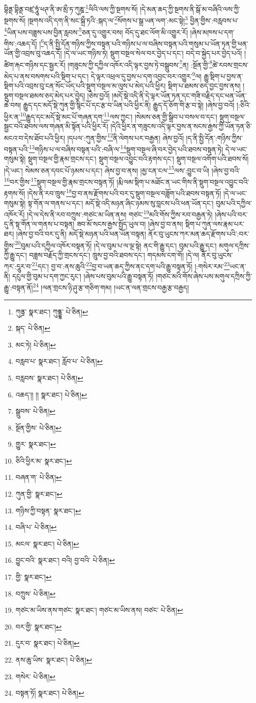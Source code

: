 བྷིནྡ་བྷིནྡ་བཛྲ་ཧཱུཾ་ཕཊ་ནི་ཨ་མྲྀ་ཏ་ཀུཎྜ་\footnote{ཀུནྜ་  སྣར་ཐང་། ཀུནྡྷ་  པེ་ཅིན། }ལིའི་ལས་ཀྱི་སྔགས་སོ། །དེ་མན་ཆད་ཀྱི་སྔགས་ནི་སྒོ་མ་བཞིའི་ལས་ཀྱི་སྔགས་སོ། །སྔགས་འདི་དག་ནི་སང་སྐྲྀ་ཏའི་:སྐད་ལ་\footnote{སྐད་  པེ་ཅིན། }སོགས་པ་སྒྲ་ཡན་ལག་:མང་སྟེ།\footnote{མང་ཏེ།  པེ་ཅིན། } བྱིན་གྱིས་:བརླབས་པ་\footnote{བརླབ་པ་  སྣར་ཐང་། རློབ་པ་  པེ་ཅིན། }ཡིན་པས་བཟླས་པས་བྱིན་རླབས་\footnote{བརླབས་  སྣར་ཐང་།  པེ་ཅིན། }ཅན་དུ་འགྱུར་བས། བོད་དུ་ཐང་ལོག་མི་འགྱུར་རོ། །ཞེས་མཁས་པ་དག་གིས་:འཆད་དོ། །\footnote{འཆད་།། །།  སྣར་ཐང་།  པེ་ཅིན། }ད་ནི་སྤྱི་དོན་གཉིས་ཀྱིས་བསྟན་པའི་གཉིས་པ་ལ་བཞིས་བསྟན་པའི་གསུམ་པ་ཡོན་ཏན་གྱི་ཕན་ཡོན་གྱི་འབྲས་བུ་འཆད་དོ། །དེ་ལ་ཡང་གཉིས་ཏེ། སྡུག་བསྔལ་སེལ་བར་བྱེད་པ་དང་། བདེ་བ་སྐྱེད་པར་བྱེད་པའོ། །ཚིག་རྐང་གཉིས་དང་སྦྱར་རོ། །གཟུངས་ཀྱི་དཀྱིལ་འཁོར་འདི་ལྟར་བྱས་ཏེ་བསྒྲུབས་\footnote{སྒྲུབས་  པེ་ཅིན། }ན། :སྔོན་གྱི་\footnote{སྔོན་གྱིས་  པེ་ཅིན། }ཚེ་རབས་གྲངས་མེད་པ་ནས་བསགས་པའི་སྡིག་པ་དང་། དེ་ལྟར་འཕྲལ་དུ་བྱས་པ་དག་འབྱང་བར་འགྱུར་\footnote{གྱུར་  སྣར་ཐང་། }ལ། རྒྱུ་སྡིག་པ་བྱས་ན་སྡིག་པའི་འབྲས་བུ་ངན་སོང་ཡོད་པའི་སྡུག་བསྔལ་མ་ལུས་པ་མེད་པའི་ཕྱིར། སྡིག་པ་ཐམས་ཅད་བྱང་བྱས་ནས། །སྡུག་བསྔལ་ཐམས་ཅད་མེད་པར་བྱེད། །ཅེས་བྱའོ། །མདོ་སྡེ་འདི་ནི་དེ་ལྟར་ཡོན་ཏན་དང་གཟི་བརྗིད་དང་ཕན་ཡོན་ཆེ་བས། རྒྱུད་དང་མདོ་སྡེ་ཀུན་གྱི་སྙིང་པོ་དང་རྩ་བ་ཡིན་པའི་ཕྱིར་ནི། རྒྱུད་དོ་ཅོག་གི་རྩ་བ་སྟེ། །ཞེས་བྱ་བའོ། །:ཅིའི་ཕྱིར་ན་\footnote{ཅིའི་ཕྱིར་མ་  སྣར་ཐང་། }རྒྱུད་དང་མདོ་སྡེ་མང་པོ་གཞན་དག་\footnote{བཞན་ག་  པེ་ཅིན། }ལས་ཀྱང་། །སེམས་ཅན་གྱི་སྒྲིབ་པ་བསལ་བ་དང་། སྡུག་བསྔལ་སྦྱང་བའི་ཐབས་ལས་གཞན་མི་སྟོན་པའི་ཕྱིར་རོ། །དེའི་ཕྱིར་ན་གཟུངས་འདི་ལྟར་བྱས་ན་སངས་རྒྱས་ཀྱི་ཡོན་ཏན་ཅི་མངའ་བ་དེས་ཐོབ་པའི་ཕྱིར། །དཔལ་:ཀུན་གྱིས་\footnote{ཀུན་གྱི་  སྣར་ཐང་། }ནི་ལེགས་པར་བརྒྱན། ཞེས་བྱའོ། །ད་ནི་སྤྱི་དོན་:གཉིས་ཀྱིས་བསྟན་པའི་\footnote{གཉིས་ཀྱི་བསྟན་  སྣར་ཐང་། }གཉིས་པ་ལ་བཞིས་བསྟན་པའི་:བཞི་ལ་\footnote{བཞི་པ་  པེ་ཅིན། }སྡུག་བསྔལ་ཞི་བར་བྱེད་པའི་ཐབས་བསྟན་ཏེ། དེ་ལ་ཡང་གསུམ་སྟེ། སྡུག་བསྔལ་གྱི་རྣམ་གྲངས་དང་། སྡུག་བསྔལ་འབྱུང་བའི་རྟགས་དང་། སྡུག་བསྔལ་འགོག་པའི་ཐབས་སོ། །དེ་ཡང་། སེམས་ཅན་དབང་པོ་ཉམས་པ་དང་། ཞེས་བྱ་བ་ནས། །མྱ་ངན་ངལ་\footnote{མངལ་  སྣར་ཐང་།  པེ་ཅིན། }ལས་:བྱུང་བ་ཡི། །ཞེས་བྱ་བའི་\footnote{བྱུང་བའི་  སྣར་ཐང་། བའི། བྱ་བའི་  པེ་ཅིན། }བར་གྱིས་\footnote{གྱི་  སྣར་ཐང་། }སྡུག་བསྔལ་གྱི་རྣམ་གྲངས་བསྟན་ཏོ། །རྨི་ལམ་སྡིག་པ་མཐོང་ན་ཡང་གིས་ནི་སྡུག་བསྔལ་འབྱུང་བའི་རྟགས་སོ། །དེས་ནི་རབ་ཁྲུས་\footnote{བཀྲུས་  པེ་ཅིན། }བྱ་བ་ནས་རྫོགས་པའི་བར་དུ་སྡུག་བསྔལ་བཟློག་པའི་ཐབས་བསྟན་ཏོ། །དེ་ལ་ཡང་གསུམ་སྟེ། སྟ་གོན་ལ་གནས་པ་དང་། མདོ་སྡེ་འདི་མཉན་ཞིང་ཉམས་སུ་བླངས་པའི་ཕན་ཡོན་དང་། བུམ་པའི་དཀྱིལ་འཁོར་རོ། །དེ་ལ་དེས་ནི་རབ་བཀྲུས་:གཙང་མ་ཡིན་ནས། གཙང་\footnote{གཙང་མ་ཡིས་ནས་གཙང་  སྣར་ཐང་། གཙང་མ་ཡིས་ནས། བཙང་  པེ་ཅིན། }མའི་གོས་ཀྱིས་རབ་བརྒྱན་ཏེ། །ཞེས་པའི་བར་དུ་ནི་སྟ་གོན་ལ་གནས་པ་བསྟན། ཟབ་མོ་སངས་རྒྱས་སྤྱོད་ཡུལ་བ། །ཞེས་བྱ་བ་ནས། སྡིག་པ་ཀུན་ལས་རྣམ་པར་ཐར། །ཞེས་བྱ་བའི་བར་དུ་ནི། མདོ་སྡེ་མཉན་པའི་ཕན་ཡོན་བསྟན། ནོར་བུ་ཡུངས་ཀར་མན་ཆད་རྫོགས་པའི་:བར་གྱིས་\footnote{བར་གྱི་  སྣར་ཐང་། }བུམ་པའི་དཀྱིལ་འཁོར་བསྟན་ཏོ། །དེ་ལ་བུམ་པ་ལ་ལྔ་སྟེ། ནང་གི་རྒྱུ་དང་། བུམ་པའི་རྒྱུ་དང་། མགུལ་དཀྲིས་ཀྱི་རྒྱུ་དང་། བཟླས་བརྗོད་ཀྱི་གྲངས་དང་། ཁྲུས་བྱ་བའི་ཐབས་དང་། གདམས་ངག་གོ། །དེ་ལ། ནོར་བུ་ཡུངས་ཀར་:དཱུར་བ་\footnote{དུར་བ་  སྣར་ཐང་།  པེ་ཅིན། }དང་། བྱ་བ་:ནས་ཆུའི་\footnote{ནས་ཆུ་ཡིས་  སྣར་ཐང་།  པེ་ཅིན། }བྱ་བ་ཡན་ཆད་ཀྱིས་ནང་དག་པའི་རྒྱུ་བསྟན་ཏོ། །:གསེར་རམ་\footnote{གསེར་  པེ་ཅིན། }ཡང་ན་ནི། དངུལ་གྱི་བུམ་པ་དག་ཀྱང་རུང་། །ཞེས་པས་བུམ་པའི་རྒྱུ་བསྟན་ཏོ། །གཙང་མའི་གོས་ཞེས་པས་མགུལ་དཀྲིས་ཀྱི་རྒྱུ་:བསྟན་ནོ།\footnote{བསྟན་ཏོ།  སྣར་ཐང་།  པེ་ཅིན། } །ལན་གྲངས་ཉི་ཤུ་རྩ་གཅིག་གམ། །ཡང་ན་ལན་གྲངས་བརྒྱ་རྩ་བརྒྱད། 